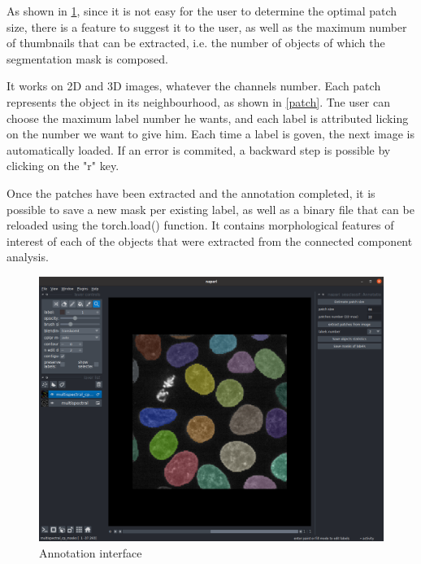 \documentclass{article}
\begin{document}
As shown in \ref{labelization}, since it is not easy for the user to determine the optimal patch size, there is a feature to suggest it to the user, as well as the maximum number of thumbnails that can be extracted, i.e. the number of objects of which the segmentation mask is composed. 

It works on 2D and 3D images, whatever the channels number. Each patch represents the object in its neighbourhood, as shown in \ref{patch}. Tne user can choose the maximum label number he wants, and each label is attributed licking on the number we want to give him. Each time a label is goven, the next image is automatically loaded. If an error is commited, a backward step is possible by clicking on the "r" key.

Once the patches have been extracted and the annotation completed, it is possible to save a new mask per existing label, as well as a binary file that can be reloaded using the torch.load() function. It contains morphological features of interest of each of the objects that were extracted from the connected component analysis.

\begin{figure}[htp!]
 \centering
 \includegraphics[scale=0.2]{Figures/annotations.png}
  \caption{Annotation interface}
  \label{labelization}

\end{figure}
\end{document}
